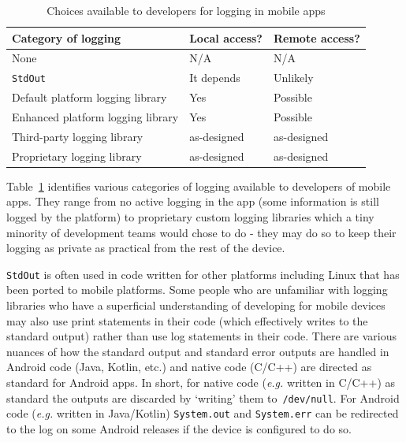 \begin{table} %
    \centering
    \begin{tabular}{lll}
         Category of logging &Local access?  &Remote access? \\
         \hline
         None            &N/A  &N/A \\
         \texttt{StdOut} &It depends &Unlikely \\
         Default platform logging library &Yes &Possible \\
         Enhanced platform logging library &Yes &Possible \\
         Third-party logging library &as-designed &as-designed \\
         Proprietary logging library &as-designed &as-designed \\
         
    \end{tabular}
    \caption{Choices available to developers for logging in mobile apps}
    \label{tab:logging-choices-for-devs}
\end{table}

Table~\ref{tab:logging-choices-for-devs} identifies various categories of logging available to developers of mobile apps. They range from no active logging in the app (some information is still logged by the platform) to proprietary custom logging libraries which a tiny minority of development teams would chose to do - they may do so to keep their logging as private as practical from the rest of the device.

\texttt{StdOut} is often used in code written for other platforms including Linux that has been ported to mobile platforms. Some people who are unfamiliar with logging libraries who have a superficial understanding of developing for mobile devices may also use print statements in their code (which effectively writes to the standard output) rather than use log statements in their code. There are various nuances of how the standard output and standard error outputs are handled in Android code (Java, Kotlin, etc.) and native code (C/C++) are directed as standard for Android apps. In short, for native code (\emph{e.g.} written in C/C++) as standard the outputs are discarded by `writing' them to~\texttt{/dev/null}. For Android code (\emph{e.g.} written in Java/Kotlin) \texttt{System.out} and \texttt{System.err} can be redirected to the log on some Android releases if the device is configured to do so.

